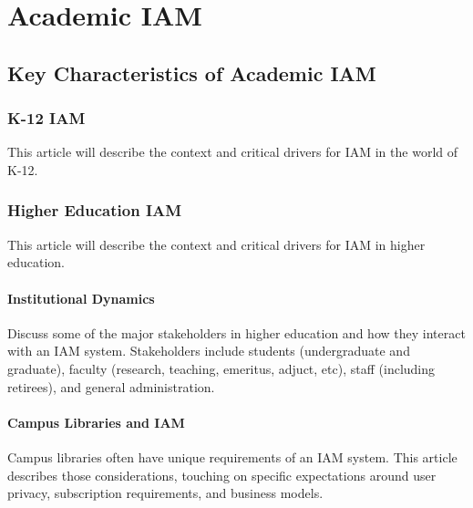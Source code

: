 \hypertarget{academic-iam}{%
\chapter{Academic IAM}\label{academic-iam}}

\hypertarget{key-characteristics-of-academic-iam}{%
\section{Key Characteristics of Academic
IAM}\label{key-characteristics-of-academic-iam}}

\hypertarget{k-12-iam}{%
\subsection{K-12 IAM}\label{k-12-iam}}

This article will describe the context and critical drivers for IAM in
the world of K-12.

\hypertarget{higher-education-iam}{%
\subsection{Higher Education IAM}\label{higher-education-iam}}

This article will describe the context and critical drivers for IAM in
higher education.

\hypertarget{institutional-dynamics}{%
\subsubsection{Institutional Dynamics}\label{institutional-dynamics}}

Discuss some of the major stakeholders in higher education and how they
interact with an IAM system. Stakeholders include students
(undergraduate and graduate), faculty (research, teaching, emeritus,
adjuct, etc), staff (including retirees), and general administration.

\hypertarget{campus-libraries-and-iam}{%
\subsubsection{Campus Libraries and IAM}\label{campus-libraries-and-iam}}

Campus libraries often have unique requirements of an IAM system. This
article describes those considerations, touching on specific
expectations around user privacy, subscription requirements, and
business models.

